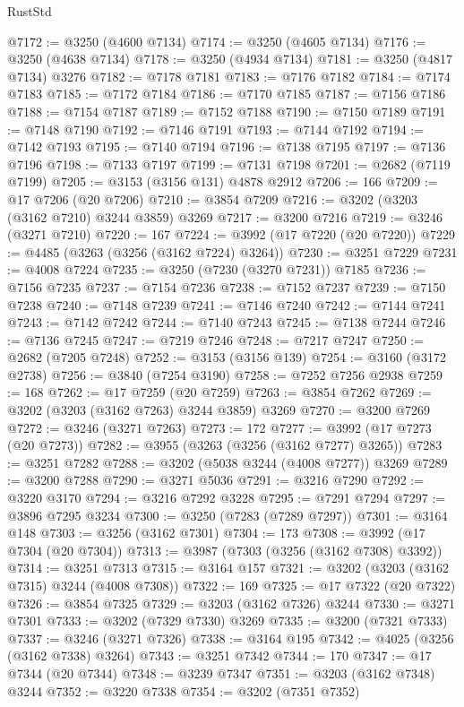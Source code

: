 \begin{lexlean}{RustStd}
\begin{coremodule}
@7172 := @3250 (@4600 @7134)
@7174 := @3250 (@4605 @7134)
@7176 := @3250 (@4638 @7134)
@7178 := @3250 (@4934 @7134)
@7181 := @3250 (@4817 @7134) @3276
@7182 := @7178 @7181
@7183 := @7176 @7182
@7184 := @7174 @7183
@7185 := @7172 @7184
@7186 := @7170 @7185
@7187 := @7156 @7186
@7188 := @7154 @7187
@7189 := @7152 @7188
@7190 := @7150 @7189
@7191 := @7148 @7190
@7192 := @7146 @7191
@7193 := @7144 @7192
@7194 := @7142 @7193
@7195 := @7140 @7194
@7196 := @7138 @7195
@7197 := @7136 @7196
@7198 := @7133 @7197
@7199 := @7131 @7198
@7201 := @2682 (@7119 @7199)
@7205 := @3153 (@3156 @131) @4878 @2912
@7206 := 166
@7209 := @17 @7206 (@20 @7206)
@7210 := @3854 @7209
@7216 := @3202 (@3203 (@3162 @7210) @3244 @3859) @3269
@7217 := @3200 @7216
@7219 := @3246 (@3271 @7210)
@7220 := 167
@7224 := @3992 (@17 @7220 (@20 @7220))
@7229 := @4485 (@3263 (@3256 (@3162 @7224) @3264))
@7230 := @3251 @7229
@7231 := @4008 @7224
@7235 := @3250 (@7230 (@3270 @7231)) @7185
@7236 := @7156 @7235
@7237 := @7154 @7236
@7238 := @7152 @7237
@7239 := @7150 @7238
@7240 := @7148 @7239
@7241 := @7146 @7240
@7242 := @7144 @7241
@7243 := @7142 @7242
@7244 := @7140 @7243
@7245 := @7138 @7244
@7246 := @7136 @7245
@7247 := @7219 @7246
@7248 := @7217 @7247
@7250 := @2682 (@7205 @7248)
@7252 := @3153 (@3156 @139)
@7254 := @3160 (@3172 @2738)
@7256 := @3840 (@7254 @3190)
@7258 := @7252 @7256 @2938
@7259 := 168
@7262 := @17 @7259 (@20 @7259)
@7263 := @3854 @7262
@7269 := @3202 (@3203 (@3162 @7263) @3244 @3859) @3269
@7270 := @3200 @7269
@7272 := @3246 (@3271 @7263)
@7273 := 172
@7277 := @3992 (@17 @7273 (@20 @7273))
@7282 := @3955 (@3263 (@3256 (@3162 @7277) @3265))
@7283 := @3251 @7282
@7288 := @3202 (@5038 @3244 (@4008 @7277)) @3269
@7289 := @3200 @7288
@7290 := @3271 @5036
@7291 := @3216 @7290
@7292 := @3220 @3170
@7294 := @3216 @7292 @3228
@7295 := @7291 @7294
@7297 := @3896 @7295 @3234
@7300 := @3250 (@7283 (@7289 @7297))
@7301 := @3164 @148
@7303 := @3256 (@3162 @7301)
@7304 := 173
@7308 := @3992 (@17 @7304 (@20 @7304))
@7313 := @3987 (@7303 (@3256 (@3162 @7308) @3392))
@7314 := @3251 @7313
@7315 := @3164 @157
@7321 := @3202 (@3203 (@3162 @7315) @3244 (@4008 @7308))
@7322 := 169
@7325 := @17 @7322 (@20 @7322)
@7326 := @3854 @7325
@7329 := @3203 (@3162 @7326) @3244
@7330 := @3271 @7301
@7333 := @3202 (@7329 @7330) @3269
@7335 := @3200 (@7321 @7333)
@7337 := @3246 (@3271 @7326)
@7338 := @3164 @195
@7342 := @4025 (@3256 (@3162 @7338) @3264)
@7343 := @3251 @7342
@7344 := 170
@7347 := @17 @7344 (@20 @7344)
@7348 := @3239 @7347
@7351 := @3203 (@3162 @7348) @3244
@7352 := @3220 @7338
@7354 := @3202 (@7351 @7352)

\end{coremodule}
\end{lexlean}
